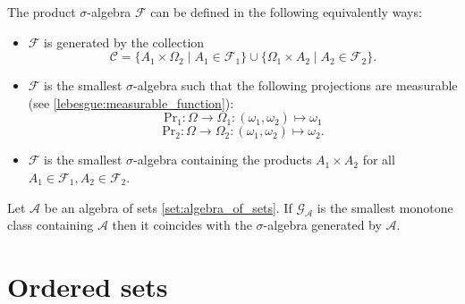     \begin{construct}\label{set:product_of_sigma_algebras}
        The product $\sigma$-algebra $\mathcal{F}$ can be defined in the following equivalently ways:
        \begin{itemize}
            \item $\mathcal{F}$ is generated by the collection
                \[\mathcal{C} = \{A_1\times \Omega_2\mid A_1\in\mathcal{F}_1\}\cup\{\Omega_1\times A_2\mid A_2\in\mathcal{F}_2\}.\]
            \item $\mathcal{F}$ is the smallest $\sigma$-algebra such that the following projections are measurable (see \ref{lebesgue:measurable_function}):
                \[\text{Pr}_1:\Omega\rightarrow\Omega_1:(\omega_1,\omega_2)\mapsto\omega_1\]
                \[\text{Pr}_2:\Omega\rightarrow\Omega_2:(\omega_1,\omega_2)\mapsto\omega_2.\]
            \item $\mathcal{F}$ is the smallest $\sigma$-algebra containing the products $A_1\times A_2$ for all $A_1\in\mathcal{F}_1, A_2\in\mathcal{F}_2$.
        \end{itemize}
    \end{construct}


    \begin{theorem}\label{set:monotone_class}
        Let $\mathcal{A}$ be an algebra of sets \ref{set:algebra_of_sets}. If $\mathcal{G}_\mathcal{A}$ is the smallest monotone class containing $\mathcal{A}$ then it coincides with the $\sigma$-algebra generated by $\mathcal{A}$.
    \end{theorem}

\section{Ordered sets}\label{section:ordered_sets}
